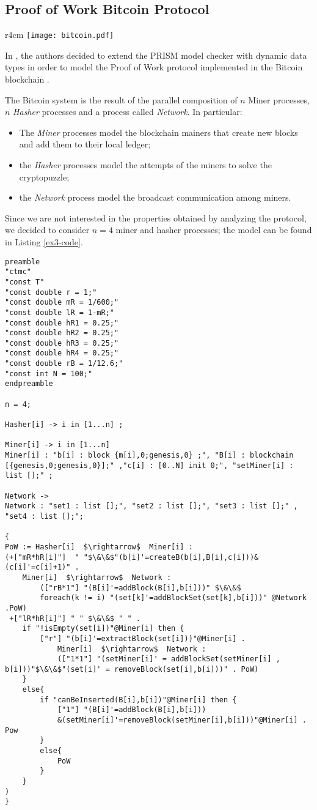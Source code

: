 \subsection{Proof of Work Bitcoin Protocol}
\begin{wrapfigure}[7]{r}{4cm}
	\texttt{[image: bitcoin.pdf]}	
\end{wrapfigure} 
In \cite{DBLP:journals/concurrency/BistarelliNGLMV23}, the authors decided to extend the PRISM model checker with
dynamic data types in order to model the Proof of Work protocol implemented in the Bitcoin blockchain \cite{bitcoin}.

The Bitcoin system is the result of the parallel composition of $n$ Miner processes, $n$  \emph{Hasher} processes and a process called \emph{Network}.
In particular: 
\begin{itemize}
	\item The \emph{Miner} processes model the blockchain mainers that create new blocks and add them to their local ledger;
	\item the \emph{Hasher} processes model the attempts of the miners to solve the cryptopuzzle;
	\item the \emph{Network} process model the broadcast communication among miners. 
\end{itemize}
Since we are not interested in the properties obtained by analyzing the protocol, we decided to consider $n=4$ miner and hasher processes; the model can be found in Listing \ref{ex3-code}.

\begin{lstlisting}[style=chor-color,caption={Choreographic language for the Proof of Work Bitcoin Protocol.},captionpos=b,label={ex3-code}]
preamble
"ctmc"
"const T"
"const double r = 1;"
"const double mR = 1/600;"
"const double lR = 1-mR;"
"const double hR1 = 0.25;"
"const double hR2 = 0.25;"
"const double hR3 = 0.25;"
"const double hR4 = 0.25;"
"const double rB = 1/12.6;"
"const int N = 100;"
endpreamble

n = 4;

Hasher[i] -> i in [1...n] ;

Miner[i] -> i in [1...n]
Miner[i] : "b[i] : block {m[i],0;genesis,0} ;", "B[i] : blockchain [{genesis,0;genesis,0}];" ,"c[i] : [0..N] init 0;", "setMiner[i] : list [];" ;

Network ->
Network : "set1 : list [];", "set2 : list [];", "set3 : list [];" , "set4 : list [];"; 
	
{
PoW := Hasher[i]  $\rightarrow$  Miner[i] :
(+["mR*hR[i]"]  " "$\&\&$"(b[i]'=createB(b[i],B[i],c[i]))&(c[i]'=c[i]+1)" . 
	Miner[i]  $\rightarrow$  Network : 
		(["rB*1"] "(B[i]'=addBlock(B[i],b[i]))" $\&\&$ 
		foreach(k != i) "(set[k]'=addBlockSet(set[k],b[i]))" @Network .PoW)
 +["lR*hR[i]"] " " $\&\&$ " " .
 	if "!isEmpty(set[i])"@Miner[i] then { 
  		["r"] "(b[i]'=extractBlock(set[i]))"@Miner[i] . 
			Miner[i]  $\rightarrow$  Network : 
			(["1*1"] "(setMiner[i]' = addBlockSet(setMiner[i] , b[i]))"$\&\&$"(set[i]' = removeBlock(set[i],b[i]))" . PoW) 
 	}
 	else{
 		if "canBeInserted(B[i],b[i])"@Miner[i] then { 
 			["1"] "(B[i]'=addBlock(B[i],b[i]))
			&(setMiner[i]'=removeBlock(setMiner[i],b[i]))"@Miner[i] . Pow 
 		}
 		else{
 			PoW
		}
	}
)
} 	
\end{lstlisting}


